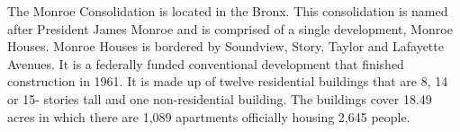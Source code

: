 The Monroe Consolidation is located in the Bronx. This consolidation is named after President James Monroe and is comprised of a single development, Monroe Houses. Monroe Houses is bordered by Soundview, Story, Taylor and Lafayette Avenues. It is a federally funded conventional development that finished construction in 1961. It is made up of twelve residential buildings that are 8, 14 or 15- stories tall and one non-residential building. The buildings cover 18.49 acres in which there are 1,089 apartments officially housing 2,645 people.